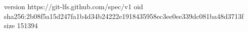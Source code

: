 version https://git-lfs.github.com/spec/v1
oid sha256:2b08f5a15d247fa1b4d34b24222e1918435958ec3ee0ee339dc081ba48d3713f
size 151394
